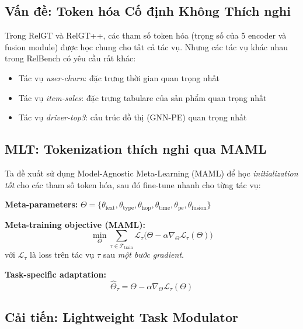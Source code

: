 \documentclass[12pt,a4paper]{article}
\begin{document}
\subsection{Vấn đề: Token hóa Cố định Không Thích nghi}

Trong RelGT và RelGT++, các tham số token hóa (trọng số của 5 encoder và
fusion module) được học chung cho tất cả tác vụ. Nhưng các tác vụ khác nhau
trong RelBench có yêu cầu rất khác:

\begin{itemize}[nosep]
  \item Tác vụ \textit{user-churn}: đặc trưng thời gian quan trọng nhất
  \item Tác vụ \textit{item-sales}: đặc trưng tabulare của sản phẩm quan trọng nhất
  \item Tác vụ \textit{driver-top3}: cấu trúc đồ thị (GNN-PE) quan trọng nhất
\end{itemize}

\subsection{MLT: Tokenization thích nghi qua MAML}

Ta đề xuất sử dụng Model-Agnostic Meta-Learning (MAML) để học
\emph{initialization tốt} cho các tham số token hóa, sau đó fine-tune
nhanh cho từng tác vụ:

\begin{mathbox}[title={MLT Objective}]
\textbf{Meta-parameters:} $\Theta = \{\theta_\text{feat}, \theta_\text{type},
  \theta_\text{hop}, \theta_\text{time}, \theta_\text{pe}, \theta_\text{fusion}\}$

\textbf{Meta-training objective (MAML):}
\begin{equation}
  \min_\Theta \sum_{\tau \in \mathcal{T}_\text{train}}
    \mathcal{L}_\tau\!\bigl(\Theta - \alpha \nabla_\Theta \mathcal{L}_\tau(\Theta)\bigr)
  \label{eq:maml}
\end{equation}
với $\mathcal{L}_\tau$ là loss trên tác vụ $\tau$ sau \emph{một bước gradient}.

\textbf{Task-specific adaptation:}
\begin{equation}
  \hat{\Theta}_\tau = \Theta - \alpha \nabla_\Theta \mathcal{L}_\tau(\Theta)
  \label{eq:adapt}
\end{equation}
\end{mathbox}

\subsection{Cải tiến: Lightweight Task Modulator}
\end{document}
